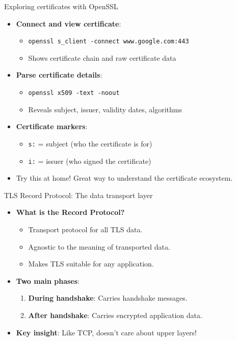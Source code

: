 \documentclass[aspectratio=169, lualatex, handout]{beamer}
\begin{document}
\begin{frame}{Exploring certificates with OpenSSL}
	\begin{itemize}
		\item \textbf{Connect and view certificate}:
		      \begin{itemize}
			      \item \texttt{openssl s\_client -connect www.google.com:443}
			      \item Shows certificate chain and raw certificate data
		      \end{itemize}
		\item \textbf{Parse certificate details}:
		      \begin{itemize}
			      \item \texttt{openssl x509 -text -noout}
			      \item Reveals subject, issuer, validity dates, algorithms
		      \end{itemize}
		\item \textbf{Certificate markers}:
		      \begin{itemize}
			      \item \texttt{s:} = subject (who the certificate is for)
			      \item \texttt{i:} = issuer (who signed the certificate)
		      \end{itemize}
		\item Try this at home! Great way to understand the certificate ecosystem.
	\end{itemize}
\end{frame}

\begin{frame}{TLS Record Protocol: The data transport layer}
	\begin{itemize}
		\item \textbf{What is the Record Protocol?}
		      \begin{itemize}
			      \item Transport protocol for all TLS data.
			      \item Agnostic to the meaning of transported data.
			      \item Makes TLS suitable for any application.
		      \end{itemize}
		\item \textbf{Two main phases}:
		      \begin{enumerate}
			      \item \textbf{During handshake}: Carries handshake messages.
			      \item \textbf{After handshake}: Carries encrypted application data.
		      \end{enumerate}
		\item \textbf{Key insight}: Like TCP, doesn't care about upper layers!
	\end{itemize}
\end{frame}
\end{document}
